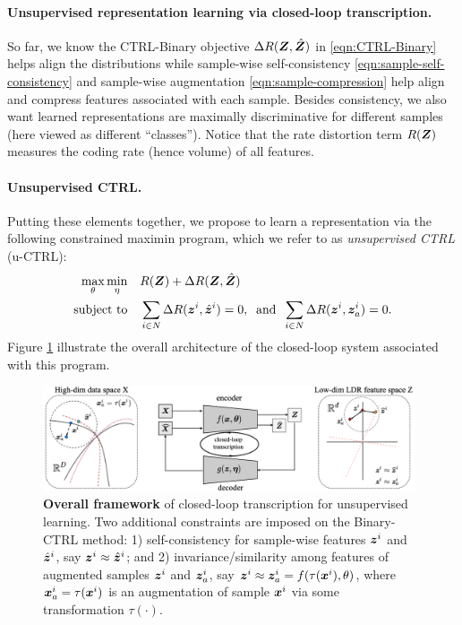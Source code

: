 \documentclass[../../book-main.tex]{subfiles}
\begin{document}
\paragraph{Unsupervised representation learning via closed-loop transcription.} 
So far, we know the CTRL-Binary objective $\Delta R(\bm{Z}, \hat{\bm{Z}})$ in \eqref{eqn:CTRL-Binary} helps align the distributions while sample-wise self-consistency \eqref{eqn:sample-self-consistency} and sample-wise augmentation \eqref{eqn:sample-compression} help align and compress features associated with each sample. Besides consistency, we also want learned representations are maximally discriminative for different samples (here viewed as different ``classes''). Notice that the rate distortion term $R(\bm{Z})$ measures the coding rate (hence volume) of all features. %

\paragraph{Unsupervised CTRL.} Putting these elements together, we propose to learn a representation via the following constrained maximin program, which we refer to as {\em unsupervised CTRL} (u-CTRL):
\begin{align}
      \max_\theta \min_\eta  \quad & R(\bm{Z}) + \Delta R(\bm{Z}, \hat{\bm{Z}}) \label{eqn:constrained_maxmin}\\
 \mbox{subject to} \quad & \sum_{i\in N} \Delta R(\bm{z}^i, \hat{\bm{z}}^i) = 0, \;\; \mbox{and} \;\; \sum_{i\in N} \Delta R(\bm{z}^i, \bm{z}_{a}^i) = 0. \nonumber
\end{align}
Figure \ref{fig:framework-uCTRL} illustrate the overall architecture of the closed-loop system associated with this program.
\begin{figure}[t]
\centering
\includegraphics[width=0.98\textwidth]{chapters/chapter5/figs/uCTRLv3.png}
\caption{\textbf{Overall framework} of closed-loop transcription for unsupervised learning. Two additional constraints are imposed on the Binary-CTRL method: 1) self-consistency for sample-wise features $\bm{z}^i$ and $\hat{\bm{z}}^i$, say $\bm{z}^i \approx \hat{\bm{z}}^i$; and 2) invariance/similarity among features of augmented samples $\bm{z}^i$ and $\bm{z}_{a}^i$, say $\bm{z}^i \approx \bm{z}_{a}^i=f(\tau(\bm{x}^i), \theta)$, where $\bm{x}^i_a=\tau(\bm{x}^i)$ is an augmentation of sample $\bm{x}^i$ via some transformation $\tau(\cdot)$.}
\label{fig:framework-uCTRL}
\end{figure}
\end{document}
